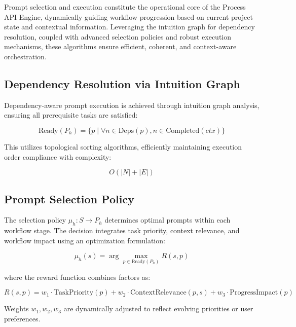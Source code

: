 \documentclass[11pt,a4paper]{article}
\begin{document}
Prompt selection and execution constitute the operational core of the Process API Engine, dynamically guiding workflow progression based on current project state and contextual information. Leveraging the intuition graph for dependency resolution, coupled with advanced selection policies and robust execution mechanisms, these algorithms ensure efficient, coherent, and context-aware orchestration.

\subsection{Dependency Resolution via Intuition Graph}
\label{subsec:dependency_resolution}

Dependency-aware prompt execution is achieved through intuition graph analysis, ensuring all prerequisite tasks are satisfied:

\[
\text{Ready}(P_h) = \{ p \mid \forall n \in \text{Deps}(p), n \in \text{Completed}(ctx) \}
\]

This utilizes topological sorting algorithms, efficiently maintaining execution order compliance with complexity:

\[
O(|N| + |E|)
\]

\subsection{Prompt Selection Policy}
\label{subsec:selection_policy}

The selection policy \( \mu_h: S \rightarrow P_h \) determines optimal prompts within each workflow stage. The decision integrates task priority, context relevance, and workflow impact using an optimization formulation:

\[
\mu_h(s) = \arg\max_{p \in \text{Ready}(P_h)} R(s, p)
\]

where the reward function combines factors as:

\[
R(s, p) = w_1\cdot\text{TaskPriority}(p) + w_2\cdot\text{ContextRelevance}(p, s) + w_3\cdot\text{ProgressImpact}(p)
\]

Weights \( w_1, w_2, w_3 \) are dynamically adjusted to reflect evolving priorities or user preferences.

\end{document}
